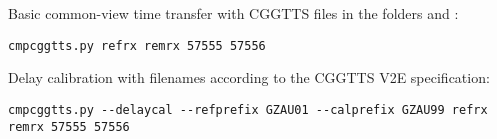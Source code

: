 Basic common-view time transfer with CGGTTS files in the folders  and :
\begin{lstlisting}[mathescape=true]
cmpcggtts.py refrx remrx 57555 57556
\end{lstlisting}

Delay calibration with filenames according to the CGGTTS V2E specification:
\begin{lstlisting}[mathescape=true]
cmpcggtts.py --delaycal --refprefix GZAU01 --calprefix GZAU99 refrx remrx 57555 57556
\end{lstlisting}







